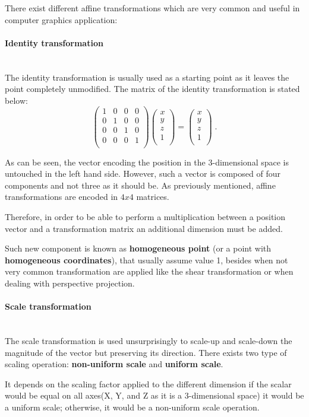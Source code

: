 \documentclass[12pt,a4paper]{extarticle}
\newcommand{\myparagraph}[1]{\paragraph{#1}\mbox{}\\}
\begin{document}
There exist different affine transformations which are very common and useful in computer graphics application:
\myparagraph{Identity transformation} The identity transformation is usually used as a starting point as it leaves the point completely unmodified. The matrix of the identity transformation is stated below:
\[
\begin{pmatrix}
1 & 0 & 0 & 0\\
0 & 1 & 0 & 0\\
0 & 0 & 1 & 0\\
0 & 0 & 0 & 1\\
\end{pmatrix}
\begin{pmatrix}
x\\
y\\
z\\
1\\
\end{pmatrix}
=
\begin{pmatrix}
x\\
y\\
z\\
1\\
\end{pmatrix}
\;.
\]

As can be seen, the vector encoding the position in the 3-dimensional space is untouched in the left hand side. However, such a vector is composed of four components and not three as it should be. As previously mentioned, affine transformations are encoded in $4x4$ matrices.

Therefore, in order to be able to perform a multiplication between a position vector and a transformation matrix an additional dimension must be added. 
 
Such new component is known as \textbf{homogeneous point} (or a point with \textbf{homogeneous coordinates}), that usually assume value 1, besides when not very common transformation are applied like the shear transformation or when dealing with perspective projection.

\myparagraph{Scale transformation} The scale transformation is used unsurprisingly to scale-up and scale-down the magnitude of the vector but preserving its direction. There exists two type of scaling operation: \textbf{non-uniform scale} and \textbf{uniform scale}. 

It depends on the scaling factor applied to the different dimension if the scalar would be equal on all axes(X, Y, and Z as it is a 3-dimensional space) it would be a uniform scale; otherwise, it would be a non-uniform scale operation. 
\end{document}
